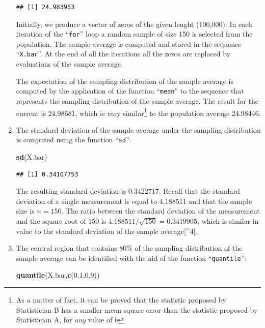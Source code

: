\documentclass[]{krantz}
\makeatletter
\newenvironment{Shaded}{\begin{snugshade}}{\end{snugshade}}
\newcommand{\KeywordTok}[1]{\textcolor[rgb]{0.13,0.29,0.53}{\textbf{#1}}}
\newcommand{\FloatTok}[1]{\textcolor[rgb]{0.00,0.00,0.81}{#1}}
\newcommand{\NormalTok}[1]{#1}
\newenvironment{kframe}{%
\medskip{}
\setlength{\fboxsep}{.8em}
 \def\at@end@of@kframe{}%
 \ifinner\ifhmode%
  \def\at@end@of@kframe{\end{minipage}}%
  \begin{minipage}{\columnwidth}%
 \fi\fi%
 \def\FrameCommand##1{\hskip\@totalleftmargin \hskip-\fboxsep
 \colorbox{shadecolor}{##1}\hskip-\fboxsep
     \hskip-\linewidth \hskip-\@totalleftmargin \hskip\columnwidth}%
 \MakeFramed {\advance\hsize-\width
   \@totalleftmargin\z@ \linewidth\hsize
   \@setminipage}}%
 {\par\unskip\endMakeFramed%
 \at@end@of@kframe}
\renewenvironment{Shaded}{\begin{kframe}}{\end{kframe}}
\theoremstyle{definition}
\theoremstyle{definition}
\theoremstyle{definition}
\theoremstyle{remark}
\makeatother
\begin{document}
\begin{enumerate}
\begin{verbatim}
## [1] 24.983953
\end{verbatim}

  Initially, we produce a vector of zeros of the given lenght (100,000).
  In each iteration of the ``\texttt{for}'' loop a random sample of size
  150 is selected from the population. The sample average is computed
  and stored in the sequence ``\texttt{X.bar}''. At the end of all the
  iterations all the zeros are replaced by evaluations of the sample
  average.

  The expectation of the sampling distribution of the sample average is
  computed by the application of the function ``\texttt{mean}'' to the
  sequence that represents the sampling distribution of the sample
  average. The result for the current is 24.98681, which is vary
  similar\footnote{As a matter of fact, it can be proved that the
    statistic proposed by Statistician B has a smaller mean square error
    than the statistic proposed by Statistician A, for \emph{any} value
    of \(b\)} to the population average 24.98446.
\item
  The standard deviation of the sample average under the sampling
  distribution is computed using the function ``\texttt{sd}'':

\begin{Shaded}
\begin{Highlighting}[]
\KeywordTok{sd}\NormalTok{(X.bar)}
\end{Highlighting}
\end{Shaded}

\begin{verbatim}
## [1] 0.34107753
\end{verbatim}

  The resulting standard deviation is 0.3422717. Recall that the
  standard deviation of a single measurement is equal to 4.188511 and
  that the sample size is \(n=150\). The ratio between the standard
  deviation of the measurement and the square root of 150 is
  \(4.188511/\sqrt{150} =0.3419905\), which is similar in value to the
  standard deviation of the sample average{[}\^{}4{]}.
\item
  The central region that contains 80\% of the sampling distribution of
  the sample average can be identified with the aid of the function
  ``\texttt{quantile}'':

\begin{Shaded}
\begin{Highlighting}[]
\KeywordTok{quantile}\NormalTok{(X.bar,}\KeywordTok{c}\NormalTok{(}\FloatTok{0.1}\NormalTok{,}\FloatTok{0.9}\NormalTok{))}
\end{Highlighting}
\end{Shaded}


\end{enumerate}
\end{document}

